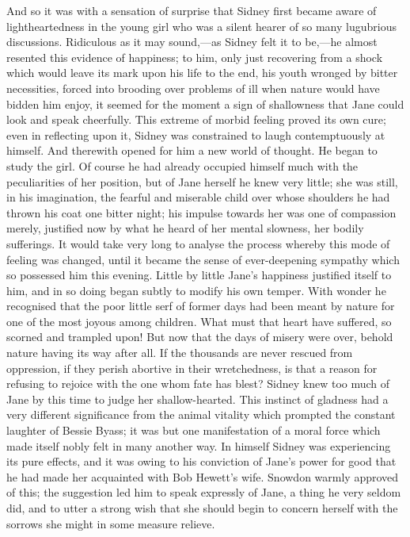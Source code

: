 And so it was with a sensation of surprise that Sidney first became
aware of lightheartedness in the young girl who was a silent hearer of
so many lugubrious discussions. Ridiculous as it may sound,---as Sidney
felt it to be,---he almost resented this evidence of happiness; to him,
only just recovering from a shock which would leave its mark upon his
life to the end, his youth wronged by bitter necessities, forced into
brooding over problems of ill when nature would have bidden him enjoy,
it seemed for the moment a sign of shallowness that Jane could look and
speak cheerfully. This extreme of morbid feeling proved its own cure;
{\protect\hypertarget{48}{}{}}even in reflecting upon it, Sidney was
constrained to laugh contemptuously at himself. And therewith opened for
him a new world of thought. He began to study the girl. Of course he had
already occupied himself much with the peculiarities of her position,
but of Jane herself he knew very little; she was still, in his
imagination, the fearful and miserable child over whose shoulders he had
thrown his coat one bitter night; his impulse towards her was one of
compassion merely, justified now by what he heard of her mental
slowness, her bodily sufferings. It would take very long to analyse the
process whereby this mode of feeling was changed, until it became the
sense of ever-deepening sympathy which so possessed him this evening.
Little by little Jane's happiness justified itself to him, and in so
doing began subtly to modify his own temper. With wonder he recognised
that the poor little serf of former days had been meant by nature for
one of the most joyous among children. What must that heart have
suffered, so scorned and trampled {\protect\hypertarget{49}{}{}}upon!
But now that the days of misery were over, behold nature having its way
after all. If the thousands are never rescued from oppression, if they
perish abortive in their wretchedness, is that a reason for refusing to
rejoice with the one whom fate has blest? Sidney knew too much of Jane
by this time to judge her shallow-hearted. This instinct of gladness had
a very different significance from the animal vitality which prompted
the constant laughter of Bessie Byass; it was but one manifestation of a
moral force which made itself nobly felt in many another way. In himself
Sidney was experiencing its pure effects, and it was owing to his
conviction of Jane's power for good that he had made her acquainted with
Bob Hewett's wife. Snowdon warmly approved of this; the suggestion led
him to speak expressly of Jane, a thing he very seldom did, and to utter
a strong wish that she should begin to concern herself with the sorrows
she might in some measure relieve.

